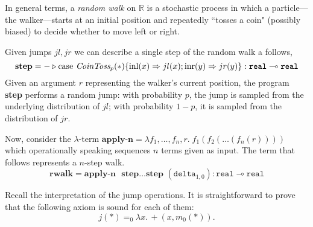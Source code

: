 \begin{example} 

In general terms, a \emph{random walk} on $\mathbb{R}$ is a stochastic process in which a particle---the walker---starts at an initial position and repeatedly ``tosses a coin" (possibly biased) to decide whether to move left or right.

Given jumps $jl,jr$ we can describe a single step of the random walk a follows,
\[
        \textbf{step} =  - \triangleright \text{case } \emph{CoinToss}_p (*) \{ \mathrm{inl}(x) \Rightarrow jl(x) ; 
        \mathrm{inr}(y) \Rightarrow jr(y) \} : \mathtt{real} \multimap \mathtt{real}
\]
Given an argument $r$ representing the walker's current position, the program \textbf{step} performs a random jump: with probability $p$, the jump is sampled from the underlying distribution of $jl$; with probability $1 - p$, it is sampled from the distribution of $jr$.

Now, consider the $\lambda$-term $\textbf{apply-n} = \lambda f_1, \dots, f_n, r .\; f_1(f_2(\dots(f_n (r))))$ which operationally speaking sequences $n$ terms given as input. The term that follows represents a $n$-step walk. 
\[
\textbf{rwalk} = \textbf{apply-n } \textbf{ step} \ldots \textbf{step } (\mathtt{delta}_{1,0}) :  \mathtt{real} \multimap \mathtt{real}
\]


Recall the interpretation of the jump operations. It is straightforward to prove that the following axiom is sound for each of them:
        \[
                j(\ast) =_0 \lambda x. \, +(x, m_0 (\ast)).
        \]


\end{example}
